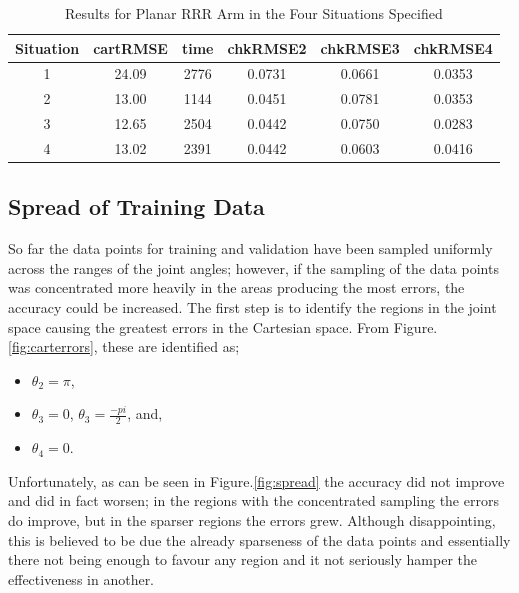 \documentclass[11.5pt, twoside, a4paper]{article}
\begin{document}
\begin{table} 
\begin{center}
\begin{tabular}{|c | c | c | c | c| c|} 
\hline
Situation &   cartRMSE & time & chkRMSE2 & chkRMSE3 & chkRMSE4 \\ \hline \hline
1 & 24.09 & 2776 & 0.0731& 0.0661& 0.0353 \\ \hline
2 & 13.00 & 1144 & 0.0451& 0.0781& 0.0353 \\ \hline
3 & 12.65 & 2504 & 0.0442& 0.0750& 0.0283 \\ \hline
4 & 13.02 & 2391 & 0.0442& 0.0603& 0.0416 \\ \hline
\end{tabular}
\caption{Results for Planar RRR Arm in the Four Situations Specified \label{tab:situations}}
\end{center}
\end{table}


\subsection{Spread of Training Data} \label{sec:spread}

So far the data points for training and validation have been sampled uniformly across the ranges of the joint angles; however, if the sampling of the data points was concentrated more heavily in the areas producing the most errors, the accuracy could be increased. The first step is to identify the regions in the joint space causing the greatest errors in the Cartesian space. From Figure.\ref{fig:carterrors}, these are identified as;
\begin{itemize}
\item $\theta_2 = \pi$, 
\item $\theta_3 = 0$, $\theta_3=\frac{-pi}{2}$, and, 
\item $\theta_4 = 0$.
\end{itemize}

Unfortunately, as can be seen in Figure.\ref{fig:spread} the accuracy did not improve and did in fact worsen; in the regions with the concentrated sampling the errors do improve, but in the sparser regions the errors grew. Although disappointing, this is believed to be due the already sparseness of the data points and essentially there not being enough to favour any region and it not seriously hamper the effectiveness in another.
\end{document}
